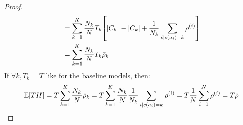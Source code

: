 \begin{proof}
\begin{align}
\begin{split}
        &= \sum_{k=1}^{K}{\frac{N_k}{N} T_k \off{\abs{C_k}- \abs{C_k} + \frac{1}{N_k}\sum_{i \mid c\of{a_i}=k}{\rho^{\of{i}}}}}%
        \\
        &= \sum_{k=1}^{K}{\frac{N_k}{N} T_k \bar{\rho}_k}%
    \end{split}
    \end{align}
    If $\forall k, T_k = T$ like for the baseline models, then:
    \begin{equation}
        \mathbb{E}\off{T H} = T \sum_{k=1}^{K}{\frac{N_k}{N} \bar{\rho}_k}%
        = T \sum_{k=1}^{K}{\frac{N_k}{N} \frac{1}{N_k}\sum_{i \mid c\of{a_i}=k}{\rho^{\of{i}}}}%
        = T \frac{1}{N} \sum_{i=1}^{N}{\rho^{\of{i}}}%
        = T \bar{\rho}%
    \end{equation}
\end{proof}

